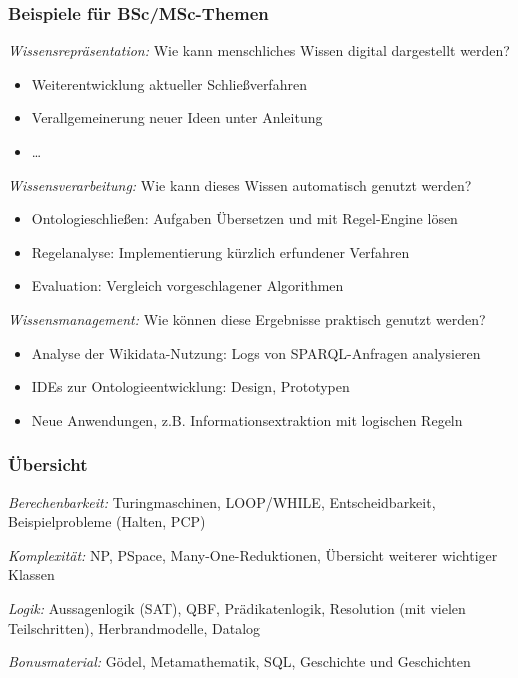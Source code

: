 \documentclass[aspectratio=1610,onlymath]{beamer}
\begin{document}
\begin{frame}\frametitle{Beispiele für BSc/MSc-Themen}

\emph{Wissensrepräsentation:} \alert{Wie kann menschliches Wissen digital dargestellt werden?}
\begin{itemize}
\item Weiterentwicklung aktueller Schließverfahren
\item Verallgemeinerung neuer Ideen unter Anleitung
\item \ldots
\end{itemize}\medskip

\emph{Wissensverarbeitung:} \alert{Wie kann dieses Wissen automatisch genutzt werden?}
\begin{itemize}
\item Ontologieschließen: Aufgaben Übersetzen und mit Regel-Engine lösen
\item Regelanalyse: Implementierung kürzlich erfundener Verfahren
\item Evaluation: Vergleich vorgeschlagener Algorithmen
\end{itemize}\medskip

\emph{Wissensmanagement:} \alert{Wie können diese Ergebnisse praktisch genutzt werden?}
\begin{itemize}
\item Analyse der Wikidata-Nutzung: Logs von SPARQL-Anfragen analysieren
\item IDEs zur Ontologieentwicklung: Design, Prototypen
\item Neue Anwendungen, z.B. Informationsextraktion mit logischen Regeln
\end{itemize}

\end{frame}



\begin{frame}\frametitle{Übersicht}


\emph{Berechenbarkeit:} Turingmaschinen, LOOP/WHILE, Entscheidbarkeit, Beispielprobleme (Halten, PCP)
\bigskip

\emph{Komplexität:} NP, PSpace, Many-One-Reduktionen, Übersicht weiterer wichtiger Klassen
\bigskip

\emph{Logik:} Aussagenlogik (SAT), QBF, Prädikatenlogik, Resolution (mit vielen Teilschritten), Herbrandmodelle, Datalog
\bigskip

\emph{Bonusmaterial:} Gödel, Metamathematik, SQL, Geschichte und Geschichten

\end{frame}
\end{document}
